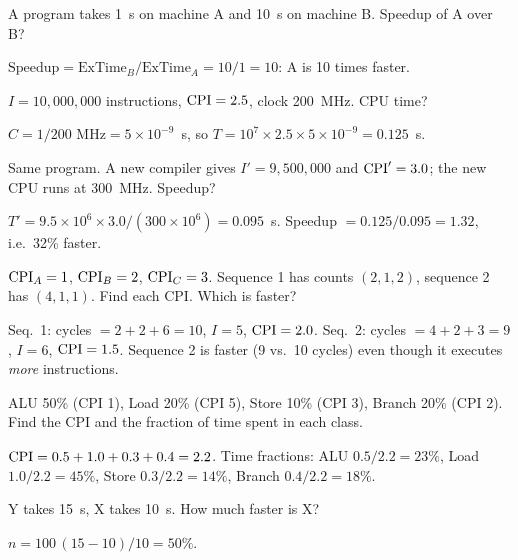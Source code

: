 \begin{exercise}[Speedup]
A program takes 1~s on machine A and 10~s on machine B. Speedup of A over B?
\end{exercise}
\begin{solution}
$\text{Speedup} = \text{ExTime}_B/\text{ExTime}_A = 10/1 = 10$: A is
10 times faster.
\end{solution}

\begin{exercise}
$I = 10{,}000{,}000$ instructions, $\mathrm{CPI}=2.5$, clock 200~MHz. CPU time?
\end{exercise}
\begin{solution}
$C = 1/200\text{ MHz} = 5\times10^{-9}$~s, so
$T = 10^7\times2.5\times5\times10^{-9} = 0.125$~s.
\end{solution}

\begin{exercise}
Same program. A new compiler gives $I'=9{,}500{,}000$ and $\mathrm{CPI}'=3.0$; the
new CPU runs at 300~MHz. Speedup?
\end{exercise}
\begin{solution}
$T' = 9.5\times10^6\times3.0/(300\times10^6) = 0.095$~s.
Speedup $=0.125/0.095 = 1.32$, i.e.\ 32\% faster.
\end{solution}

\begin{exercise}
$\mathrm{CPI}_A=1$, $\mathrm{CPI}_B=2$, $\mathrm{CPI}_C=3$. Sequence 1 has counts $(2,1,2)$,
sequence 2 has $(4,1,1)$. Find each CPI. Which is faster?
\end{exercise}
\begin{solution}
Seq.~1: cycles $=2+2+6=10$, $I=5$, $\mathrm{CPI}=2.0$.
Seq.~2: cycles $=4+2+3=9$, $I=6$, $\mathrm{CPI}=1.5$.
Sequence 2 is faster (9 vs.\ 10 cycles) even though it executes \emph{more}
instructions.
\end{solution}

\begin{exercise}
ALU 50\% (CPI 1), Load 20\% (CPI 5), Store 10\% (CPI 3), Branch 20\% (CPI 2).
Find the CPI and the fraction of time spent in each class.
\end{exercise}
\begin{solution}
$\mathrm{CPI} = 0.5+1.0+0.3+0.4 = 2.2$. Time fractions: ALU $0.5/2.2=23\%$, Load
$1.0/2.2=45\%$, Store $0.3/2.2=14\%$, Branch $0.4/2.2=18\%$.
\end{solution}

\begin{exercise}[$n\%$ faster]
Y takes 15~s, X takes 10~s. How much faster is X?
\end{exercise}
\begin{solution}
$n = 100\,(15-10)/10 = 50\%$.
\end{solution}


